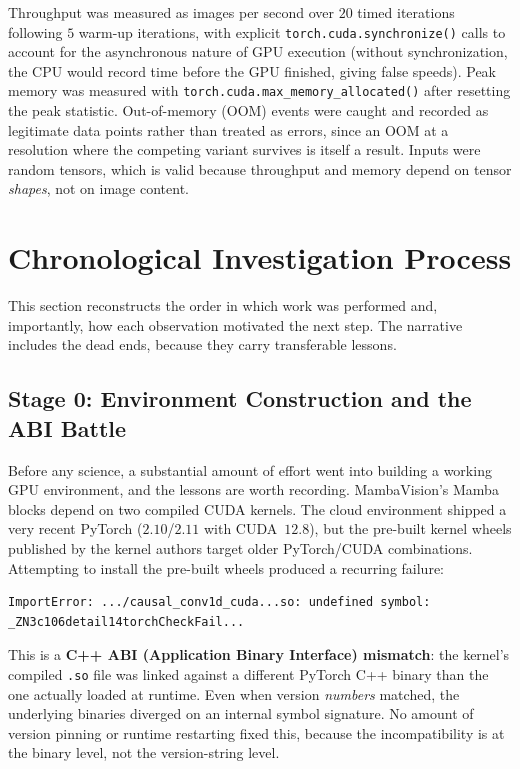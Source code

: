 \documentclass[11pt,a4paper]{article}
\begin{document}
Throughput was measured as images per second over $20$ timed iterations following $5$ warm-up iterations, with explicit \texttt{torch.cuda.synchronize()} calls to account for the asynchronous nature of GPU execution (without synchronization, the CPU would record time before the GPU finished, giving false speeds). Peak memory was measured with \texttt{torch.cuda.max\_memory\_allocated()} after resetting the peak statistic. Out-of-memory (OOM) events were caught and recorded as legitimate data points rather than treated as errors, since an OOM at a resolution where the competing variant survives is itself a result. Inputs were random tensors, which is valid because throughput and memory depend on tensor \emph{shapes}, not on image content.

\section{Chronological Investigation Process}
\label{sec:chrono}

This section reconstructs the order in which work was performed and, importantly, how each observation motivated the next step. The narrative includes the dead ends, because they carry transferable lessons.

\subsection{Stage 0: Environment Construction and the ABI Battle}

Before any science, a substantial amount of effort went into building a working GPU environment, and the lessons are worth recording. MambaVision's Mamba blocks depend on two compiled CUDA kernels. The cloud environment shipped a very recent PyTorch ($2.10$/$2.11$ with CUDA~$12.8$), but the pre-built kernel wheels published by the kernel authors target older PyTorch/CUDA combinations. Attempting to install the pre-built wheels produced a recurring failure:
\begin{lstlisting}[language=bash, basicstyle=\ttfamily\scriptsize]
ImportError: .../causal_conv1d_cuda...so: undefined symbol:
_ZN3c106detail14torchCheckFail...
\end{lstlisting}
This is a \textbf{C++ ABI (Application Binary Interface) mismatch}: the kernel's compiled \texttt{.so} file was linked against a different PyTorch C++ binary than the one actually loaded at runtime. Even when version \emph{numbers} matched, the underlying binaries diverged on an internal symbol signature. No amount of version pinning or runtime restarting fixed this, because the incompatibility is at the binary level, not the version-string level.
\end{document}
